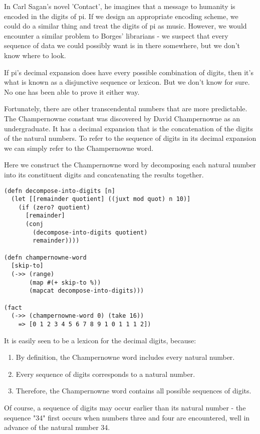 \documentclass[numbers, preprint]{sigplanconf}
\begin{document}
In Carl Sagan's novel 'Contact'\cite{Contact}, he imagines that a message to humanity is encoded in the digits of pi.
If we design an appropriate encoding scheme, we could do a similar thing and treat the digits of pi as music. However,
we would encounter a similar problem to Borges' librarians - we suspect that every sequence of data we could possibly want
is in there somewhere, but we don't know where to look.

If pi's decimal expansion does have every possible combination of digits, then it's what is known as a disjunctive
sequence or lexicon. But we don't know for sure. No one has been able to prove it either way.

Fortunately, there are other transcendental numbers that are more predictable. The Champernowne constant was discovered
by David Champernowne as an undergraduate\cite{The construction of decimals normal in the scale of ten}. It has a
decimal expansion that is the concatenation of the digits of the natural numbers. To refer to the sequence of digits
in its decimal expansion we can simply refer to the Champernowne word.

Here we construct the Champernowne word by decomposing each natural number into its constituent digits and concatenating
the results together.

\begin{verbatim}
(defn decompose-into-digits [n]
  (let [[remainder quotient] ((juxt mod quot) n 10)]
    (if (zero? quotient)
      [remainder]
      (conj
        (decompose-into-digits quotient)
        remainder))))

(defn champernowne-word
  [skip-to]
  (->> (range)
       (map #(+ skip-to %))
       (mapcat decompose-into-digits)))

(fact
  (->> (champernowne-word 0) (take 16))
    => [0 1 2 3 4 5 6 7 8 9 1 0 1 1 1 2])
\end{verbatim}

It is easily seen to be a lexicon for the decimal digits, because:
\begin{enumerate}
    \item By definition, the Champernowne word includes every natural number.
    \item Every sequence of digits corresponds to a natural number.
    \item Therefore, the Champernowne word contains all possible sequences of digits.
\end{enumerate}
Of course, a sequence of digits may occur earlier than its natural number - the sequence "34" first occurs when numbers three and
four are encountered, well in advance of the natural number 34.
\end{document}
